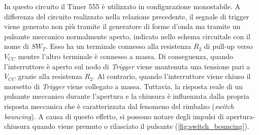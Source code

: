 \noindent
In questo circuito il Timer 555 è utilizzato in configurazione monostabile. A differenza del circuito realizzato nella relazione precedente, il segnale di trigger viene generato non più tramite il generatore di forme d'onda ma tramite un pulsante meccanico normalmente aperto, indicato nello schema circuitale con il nome di $SW_{T}$. 
Esso ha un terminale connesso alla resistenza $R_2$ di pull-up verso $V_{CC}$ mentre l'altro terminale è connesso a massa. Di conseguenza, quando l'interruttore è aperto sul nodo di \textit{Trigger} viene mantenuta una tensione pari a $V_{CC}$ grazie alla resistenza $R_2$. Al contrario, quando l'interruttore viene chiuso il morsetto di \textit{Trigger} viene collegato a massa. Tuttavia, la risposta reale di un pulsante meccanico durante l'apertura e la chiusura è influenzata dalla propria risposta meccanica che è caratterizzata dal fenomeno del rimbalzo (\textit{switch bouncing}). A causa di questo effetto, si possono notare degli impulsi di apertura-chiusura quando viene premuto o rilasciato il pulsante (\Fig\ref{fig:switch_bouncing}).
